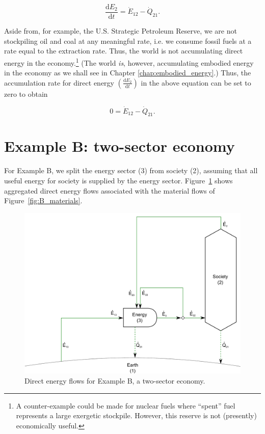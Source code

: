 \begin{equation} \label{eq:dE_2/dt_single_sector}
	\frac{\mathrm{d}E_{2}}{\mathrm{d}t} = \dot{E}_{12} - \dot{Q}_{21}.
\end{equation}

Aside from, for example, the U.S. Strategic Petroleum Reserve, 
we are not stockpiling oil and coal at any meaningful rate, 
i.e. we consume fossil fuels at a rate equal to the extraction rate. 
Thus, the world is not accumulating direct energy 
in the economy.\footnote{A counter-example could be made 
for nuclear fuels where ``spent'' fuel represents a large exergetic stockpile. 
However, this reserve is not (presently) economically useful.} 
(The world \emph{is}, however, 
accumulating embodied energy in the economy as we shall see 
in Chapter \ref{chap:embodied_energy}.) 
Thus, the accumulation rate for direct energy 
$\left( \frac{\mathrm{d}E_{2}}{\mathrm{d}t} \right)$ in the above equation 
can be set to zero to obtain

\begin{equation} \label{eq:single_sector_direct_energy_no_accumulation}
	0 = \dot{E}_{12} - \dot{Q}_{21}.
\end{equation}


\section{Example B: two-sector economy}

For Example B, we split the energy sector (3) from 
society (2), assuming that all useful energy for society is 
supplied by the energy sector. Figure~\ref{fig:B_energy} shows aggregated
direct energy flows associated with the material flows of Figure~\ref{fig:B_materials}.

\begin{figure}[h!]
\centering
\includegraphics[width=0.8\linewidth]{Part_2/Chapter_Energy/images/2_sector_direct_energy.pdf}
\caption{Direct energy flows for Example B, a two-sector economy.}
\label{fig:B_energy}
\end{figure}


